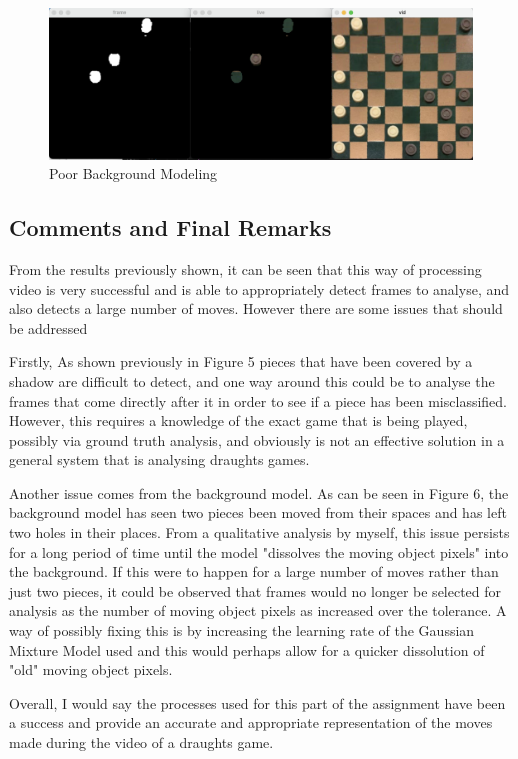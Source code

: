 \documentclass[11pt]{article}
\begin{document}
    \newpage

    \begin{figure}
        \centering
        \includegraphics[scale=0.3]{Poor-Detection.png}
        \caption{Poor Background Modeling}
    \end{figure}

    \subsection{Comments and Final Remarks}
    \par
    From the results previously shown, it can be seen that this way of processing video is very successful and is able to appropriately detect frames to analyse, and also detects a large number of moves. However there are some 
    issues that should be addressed
    \par
    Firstly, As shown previously in Figure 5 pieces that have been covered by a shadow are difficult to detect, and one way around this could be to analyse the frames that come directly after it in order to see if a piece has been
    misclassified. However, this requires a knowledge of the exact game that is being played, possibly via ground truth analysis, and obviously is not an effective solution in a general system that is analysing draughts games.
    \par
    Another issue comes from the background model. As can be seen in Figure 6, the background model has seen two pieces been moved from their spaces and has left two holes in their places. From a qualitative analysis by myself, this 
    issue persists for a long period of time until the model "dissolves the moving object pixels" into the background. If this were to happen for a large number of moves rather than just two pieces, it could be observed that frames 
    would no longer be selected for analysis as the number of moving object pixels as increased over the tolerance. A way of possibly fixing this is by increasing the learning rate of the Gaussian Mixture Model used and this would perhaps 
    allow for a quicker dissolution of "old" moving object pixels.
    \par
    Overall, I would say the processes used for this part of the assignment have been a success and provide an accurate and appropriate representation of the moves made during the video of a draughts game.
\end{document}
